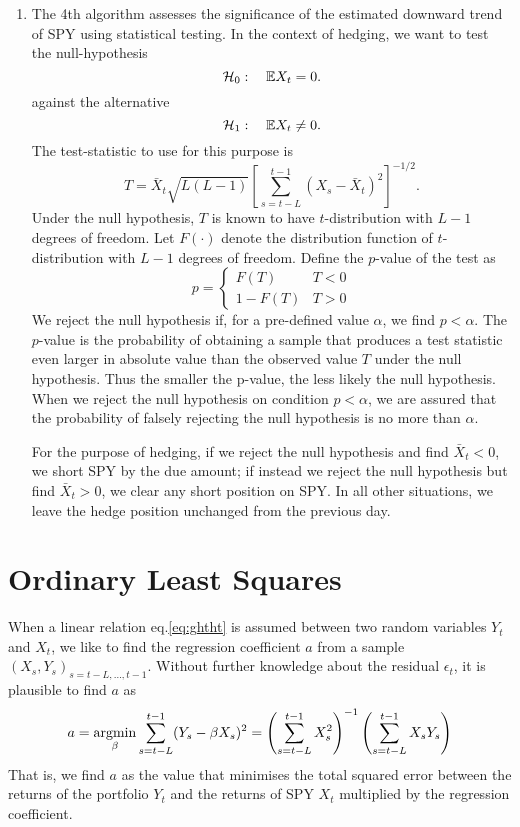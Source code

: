 \documentclass{article}
\begin{document}
\begin{enumerate}
\item The 4th algorithm assesses the significance of the estimated
  downward trend of SPY using statistical testing. In the context of
  hedging, we want to test the null-hypothesis
  \[
    \mathcal H_0:\quad
    \mathbb{E} X_t = 0.
  \]
  against the alternative
  \[
    \mathcal H_1:\quad
    \mathbb{E} X_t \neq 0.
  \]
  The test-statistic to use for this purpose is
  \[
    T = \bar X_t \sqrt{L(L - 1)} \left[
      \sum_{s=t-L}^{t-1} (X_s - \bar X_t)^2
    \right]^{-1/2}.
  \]
  Under the null hypothesis, $T$ is known to have $t$-distribution
  with $L-1$ degrees of freedom. Let $F(\cdot)$ denote the
  distribution function of $t$-distribution with $L-1$ degrees of
  freedom. Define the $p$-value of the test as
  \[
    p = \left\{
      \begin{array}{ll}
        F(T) & T < 0 \\
        1 - F(T) & T > 0
      \end{array}
    \right.
  \]
  We reject the null hypothesis if, for a pre-defined value $\alpha$,
  we find $p < \alpha$. The $p$-value is the probability of obtaining
  a sample that produces a test statistic even larger in absolute value
  than the observed value $T$ under the null hypothesis. Thus the
  smaller the p-value, the less likely the null hypothesis. When we
  reject the null hypothesis on condition $p < \alpha$, we are assured
  that the probability of falsely rejecting the null hypothesis is no
  more than $\alpha$.

  For the purpose of hedging, if we reject the null hypothesis and
  find $\bar X_t < 0$, we short SPY by the due amount; if instead we
  reject the null hypothesis but find $\bar X_t > 0$, we clear any
  short position on SPY. In all other situations, we leave the hedge
  position unchanged from the previous day.
  
\end{enumerate}

\section{Ordinary Least Squares}\label{sec:ols}
When a linear relation eq.\eqref{eq:ghtht} is assumed between two
random variables $Y_t$ and $X_t$, we like to find the regression
coefficient $a$ from a sample $(X_s, Y_s)_{s=t-L, \dots,
  t-1}$. Without further knowledge about the residual $\epsilon_t$, it
is plausible to find $a$ as
\begin{equation}
  \label{eq:joi90}
  a = \operatorname*{argmin}_{\beta} \sum_{s=t-L}^{t-1} (Y_s - \beta X_s)^2
  =
  \left(
    \sum_{s=t-L}^{t-1} X_s^2
  \right)^{-1}
  \left(
    \sum_{s=t-L}^{t-1} X_s Y_s
  \right)
\end{equation}
That is, we find $a$ as the value that minimises the total squared
error between the returns of the portfolio $Y_t$ and the returns of
SPY $X_t$ multiplied by the regression coefficient.
\end{document}

